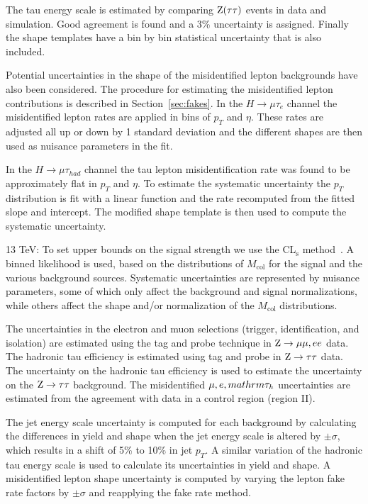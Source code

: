\documentclass[oneside, letterpaper, oldfontcommands]{memoir}
\begin{document}
{{{The tau energy scale is estimated by comparing $\mathrm{Z}(\tau \tau)$ events in data and simulation. Good agreement is found and a 3\% uncertainty is assigned. Finally the shape templates have a bin by bin statistical uncertainty that is also included.


Potential uncertainties in the shape of the misidentified lepton backgrounds have also been considered. The
procedure for estimating the misidentified lepton contributions is described in
Section~\ref{sec:fakes}.
In the \mbox{$H \rightarrow \mu \tau_{e}$} channel the misidentified lepton rates are applied in bins of $p_{T}$ and $\eta$. These rates are
adjusted all up or down by 1 standard deviation and the different shapes are then used as nuisance parameters in the fit.

In the $H \rightarrow \mu \tau_{had}$ channel the tau lepton misidentification rate was found to be approximately flat in $p_{T}$ and $\eta$. To
estimate the systematic uncertainty the $p_{T}$ distribution is fit with a linear function and
the rate recomputed from the fitted slope and intercept. The modified shape template is then
used to compute the systematic uncertainty.




13 TeV:
To set upper bounds on the signal strength  we use the
CL$_{\mathrm{s}}$ method~\cite{Junk,Read2}.  A binned likelihood is used, based on the
distributions of $M_\text{col}$ for the signal and the various background sources.
Systematic uncertainties are represented by nuisance parameters, some of which only affect
the background and signal normalizations, while  others affect the shape and/or
normalization of the $M_\text{col}$ distributions.

The uncertainties in the electron and muon selections (trigger, identification, and isolation) are estimated using the tag and probe technique in $\mathrm{Z} \rightarrow \mu \mu, e e$ data. The hadronic tau efficiency is estimated using tag and probe in $\mathrm{Z} \rightarrow \mathrm{\tau} \mathrm{\tau}$ data. The uncertainty on the hadronic tau efficiency is used to estimate the uncertainty on the $\mathrm{Z} \rightarrow \mathrm{\tau} \mathrm{\tau}$ background. The misidentified $\mu, e, mathrm{\tau_{h}}$ uncertainties are estimated from the agreement with data in a control region (region II).

The jet energy scale uncertainty is computed for each background by calculating the differences in yield and shape when the jet energy scale is altered by $\pm\sigma$, which results in a shift of 5\% to 10\% in jet $p_{T}$. A similar variation of the hadronic tau energy scale is used to calculate its uncertainties in yield and shape. A misidentified lepton shape uncertainty is computed by varying the lepton fake rate factors by $\pm\sigma$ and reapplying the fake rate method.

}}}
\end{document}
